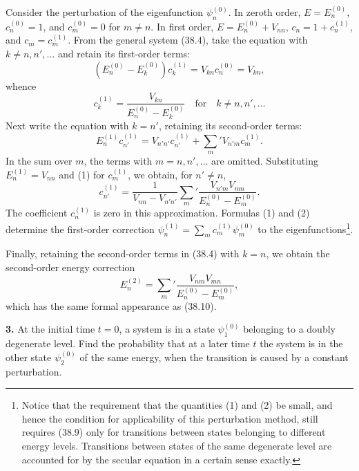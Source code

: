Consider the perturbation of the eigenfunction $\psi_n^{(0)}$. In zeroth
order, $E=E_n^{(0)}$, $c_n^{(0)}=1$, and $c_m^{(0)}=0$ for $m\ne n$. In
first order, $E=E_n^{(0)}+V_{nn}$, $c_n=1+c_n^{(1)}$, and
$c_m=c_m^{(1)}$. From the general system (38.4), take the equation with
$k\ne n,n',\ldots$ and retain its first-order terms:
\[
  (E_n^{(0)}-E_k^{(0)})c_k^{(1)}=V_{kn}c_n^{(0)}=V_{kn},
\]
whence
\begin{equation}
  c_k^{(1)}=\frac{V_{kn}}{E_n^{(0)}-E_k^{(0)}}
  \quad\text{for}\quad k\ne n,n',\ldots
  \tag{1}
\end{equation}
Next write the equation with $k=n'$, retaining its second-order terms:
\[
  E_n^{(1)}c_{n'}^{(1)}=V_{n'n'}c_{n'}^{(1)}
  +\sum_m'V_{n'm}c_m^{(1)}.
\]
In the sum over $m$, the terms with $m=n,n',\ldots$ are omitted. Substituting
$E_n^{(1)}=V_{nn}$ and (1) for $c_m^{(1)}$, we obtain, for $n'\ne n$,
\begin{equation}
  c_{n'}^{(1)}=\frac1{V_{nn}-V_{n'n'}}
  \sum_m'\frac{V_{n'm}V_{mn}}{E_n^{(0)}-E_m^{(0)}}.
  \tag{2}
\end{equation}
The coefficient $c_n^{(1)}$ is zero in this approximation. Formulas (1) and
(2) determine the first-order correction
$\psi_n^{(1)}=\sum_m c_m^{(1)}\psi_m^{(0)}$ to the
eigenfunctions\footnote{Notice that the requirement that the quantities (1)
and (2) be small, and hence the condition for applicability of this
perturbation method, still requires (38.9) only for transitions between
states belonging to different energy levels. Transitions between states of
the same degenerate level are accounted for by the secular equation in a
certain sense exactly.}.

Finally, retaining the second-order terms in (38.4) with $k=n$, we obtain
the second-order energy correction
\begin{equation}
  E_n^{(2)}=\sum_m'\frac{V_{nm}V_{mn}}{E_n^{(0)}-E_m^{(0)}},
  \tag{3}
\end{equation}
which has the same formal appearance as (38.10).

\ProblemHeading
\textbf{3.} At the initial time $t=0$, a system is in a state
$\psi_1^{(0)}$ belonging to a doubly degenerate level. Find the probability
that at a later time $t$ the system is in the other state $\psi_2^{(0)}$ of
the same energy, when the transition is caused by a constant perturbation.

